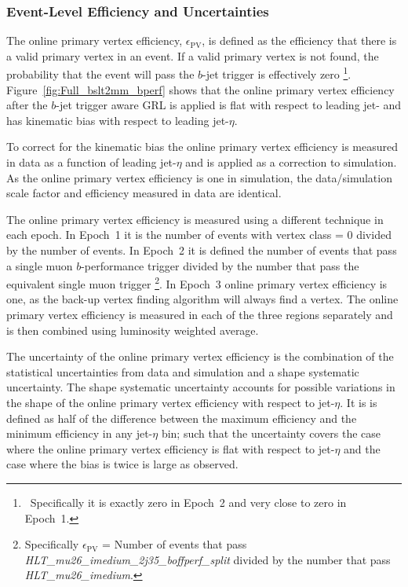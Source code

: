 \subsubsection{Event-Level Efficiency and Uncertainties}
\label{sec:trig-eventLevelEff}

The online primary vertex efficiency, $\epsilon_{\text{PV}}$,
is defined as the efficiency that there is a valid primary vertex in an event.
If a valid primary vertex is not found, the probability that the event will pass the $b$-jet trigger is effectively zero
\footnote{\ Specifically it is exactly zero in Epoch~2 and very close to zero in Epoch~1.}.
Figure~\ref{fig:Full_bslt2mm_bperf} shows that the online primary vertex efficiency
after the $b$-jet trigger aware GRL is applied is flat with respect to leading jet-\pT{}
and has kinematic bias with respect to leading jet-$\eta$.

To correct for the kinematic bias the online primary vertex efficiency is measured in data as a function of leading jet-$\eta$ and is applied as a correction to simulation.
As the online primary vertex efficiency is one in simulation, the data/simulation scale factor and efficiency measured in data are identical.

The online primary vertex efficiency is measured using a different technique in each epoch.
In Epoch~1 it is the number of events with vertex class = 0 divided by the number of events.
In Epoch~2 it is defined the number of events that pass a single muon $b$-performance trigger divided
by the number that pass the equivalent single muon trigger \footnote{Specifically $\epsilon_{\text{PV}}$ = Number of events that pass \textit{HLT\_mu26\_imedium\_2j35\_boffperf\_split}
  divided by the number that pass \textit{HLT\_mu26\_imedium}.}.
In Epoch~3 online primary vertex efficiency is one, as the back-up vertex finding algorithm will always find a vertex.
The online primary vertex efficiency is measured in each of the three regions separately and is then combined using luminosity weighted average.

The uncertainty of the online primary vertex efficiency is the combination of the statistical uncertainties from data and simulation
and a shape systematic uncertainty.
The shape systematic uncertainty accounts for possible variations in the shape of the online primary vertex efficiency with respect to jet-$\eta$.
It is is defined as half of the difference between the maximum efficiency and the minimum efficiency in any jet-$\eta$ bin;
such that the uncertainty covers the case where the online primary vertex efficiency is flat with respect to jet-$\eta$ and
the case where the bias is twice is large as observed.

